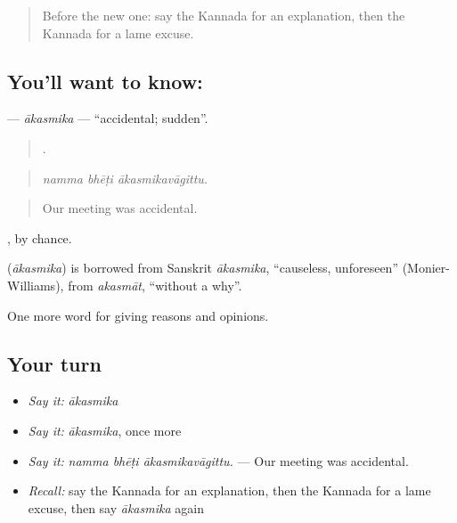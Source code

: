 \label{lesson:KA-C386-akasmika}



\begin{quote}
Before the new one: say the Kannada for an explanation, then the Kannada for a lame excuse.
\end{quote}

\subsection*{You'll want to know: }
\textbf{} — \emph{ākasmika} — \textquotedblleft{}accidental; sudden\textquotedblright{}.

\begin{quote}
  .
\end{quote}

\begin{quote}
\emph{namma bhēṭi ākasmikavāgittu.}
\end{quote}

\begin{quote}
Our meeting was accidental.
\end{quote}

, by chance.

\begin{cousinweb}
\textbf{} (\emph{ākasmika}) is borrowed from Sanskrit \emph{ākasmika}, \textquotedblleft{}causeless, unforeseen\textquotedblright{} (Monier-Williams), from \emph{akasmāt}, \textquotedblleft{}without a why\textquotedblright{}.
\end{cousinweb}

\begin{grammarlens}[title={What you've built}]
One more word for giving reasons and opinions.
\end{grammarlens}

\subsection*{Your turn}
\begin{itemize}
\raggedright
  \item \emph{Say it:} \emph{ākasmika}
  \item \emph{Say it:} \emph{ākasmika}, once more
  \item \emph{Say it:} \emph{namma bhēṭi ākasmikavāgittu.} — Our meeting was accidental.
  \item \emph{Recall:} say the Kannada for an explanation, then the Kannada for a lame excuse, then say \emph{ākasmika} again
\end{itemize}

